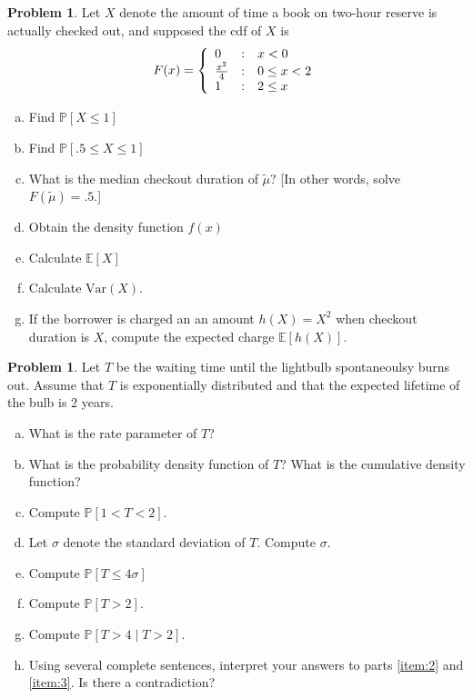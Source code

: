 \documentclass[10pt]{article}
\theoremstyle{definition}
\newtheorem{problem}[theorem]{Problem}
\newcommand{\1}[1]{\textbf{1}_{\left[#1\right]}} %
\def\E{\mathbb{E}} %
\def\P{\mathbb{P}} %
\def\Var{\mathrm{Var}} %
\begin{document}
\begin{problem}
  Let $X$ denote the amount of time a book on two-hour reserve is actually
  checked out, and supposed the cdf of $X$ is
  \begin{equation*}
    F(x) = \left\{ \begin{array}{l@{\quad:\quad}l} 0 & x<0\\ \frac{x^{2}}{4}& 0 \leq x<2\\ 1 &2 \leq x\end{array}\right.
  \end{equation*}
  \begin{enumerate}[(a)]
    \item Find $\P\left[X \leq 1\right]$
    \item Find $\P\left[.5 \leq X \leq 1\right]$
    \item What is the median checkout duration of $\tilde{\mu}$? [In other
    words, solve $F(\tilde{\mu})=.5$.]
    \item Obtain the density function $f(x)$
    \item Calculate $\E\left[X \right]$
    \item Calculate $\Var(X)$.
    \item If the borrower is charged an an amount $h(X)=X^{2}$ when checkout
    duration is $X$, compute the expected charge $\E\left[h(X) \right]$.
  \end{enumerate}
\end{problem}

\begin{problem}
  Let $T$ be the waiting time until the lightbulb spontaneoulsy burns out. Assume that $T$ is
  exponentially distributed and that the expected lifetime of the bulb is 2 years.
  \begin{enumerate}[(a)]
    \item What is the rate parameter of $T$?
    \item What is the probability density function of $T$? What is the cumulative density function?
    \item Compute $\P\left[1<T<2 \right]$.
    \item Let $\sigma$ denote the standard deviation of $T$. Compute $\sigma$.
    \item Compute $\P\left[T \leq 4\sigma \right]$
    \item \label{item:2} Compute $\P\left[T>2 \right]$.
    \item \label{item:3} Compute $\P\left[T>4\mid T>2 \right]$.
    \item Using several complete sentences, interpret your answers to parts
    \ref{item:2} and \ref{item:3}. Is there a contradiction?
  \end{enumerate}
\end{problem}
\end{document}
